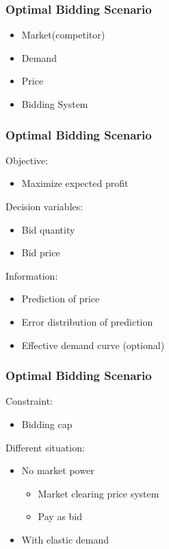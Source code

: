 \documentclass[compress,handout,10pt]{beamer}
\let\olditem\item
\renewcommand{\item}{\setlength{\itemsep}{0.5\baselineskip}\olditem}
\begin{document}
\begin{frame}
    \frametitle{Optimal Bidding Scenario}
     \begin{itemize}
     \item Market(competitor)
     \item Demand
     \item Price
     \item Bidding System
     \end{itemize}    
\end{frame}

\begin{frame}
    \frametitle{Optimal Bidding Scenario}
     Objective:
     \begin{itemize}
     \item Maximize expected profit
     \end{itemize}
     Decision variables:
     \begin{itemize}
     \item Bid quantity
     \item Bid price
     \end{itemize}  
     Information:
     \begin{itemize}
     \item Prediction of price
     \item Error distribution of prediction
     \item Effective demand curve (optional)
     \end{itemize}
\end{frame}

\begin{frame}
    \frametitle{Optimal Bidding Scenario}
     Constraint:
     \begin{itemize}
     \item Bidding cap
     \end{itemize}
     Different situation:
     \begin{itemize}
     \item No market power
          \begin{itemize}
          \item Market clearing price system
          \item Pay as bid
          \end{itemize}
     \item With elastic demand
     \end{itemize}    
\end{frame}
\end{document}
